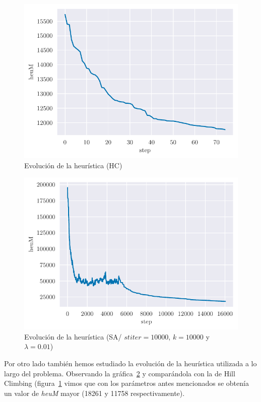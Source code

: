 \begin{figure}[H]
    \centering
    \includegraphics{include/plots/ex3_heu_steps-HC.pdf}
    \caption{Evolución de la heurística (HC)}
    \label{fig:ex3_heu_steps-HC} 
\end{figure}

\begin{figure}[H]
    \centering
    \includegraphics{include/plots/ex3_heu_steps-10000-10000-0.01.pdf}
    \caption{Evolución de la heurística (SA/ $stiter=10000$, $k=10000$ y $\lambda=0.01$)}
    \label{fig:ex3_heu_steps-10000-10000-0.01} 
\end{figure}

Por otro lado también hemos estudiado la evolución de la heurística utilizada a lo largo del problema. Observando la gráfica~\ref{fig:ex3_heu_steps-10000-10000-0.01} y comparándola con la de Hill Climbing (figura~\ref{fig:ex3_heu_steps-HC} vimos que con los parámetros antes mencionados se obtenía un valor de \emph{heuM} mayor (18261 y  11758 respectivamente).

